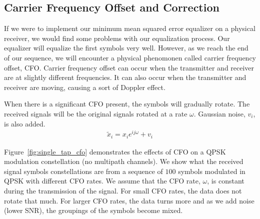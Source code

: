  
\subsection{Carrier Frequency Offset and Correction}

If we were to implement our minimum mean squared error equalizer on a physical receiver, we would find some problems with our equalization process.  
Our equalizer will equalize the first symbols very well.  However, as we reach the end of our sequence, we will encounter a physical phenomonen called carrier frequency offset, CFO.
Carrier frequency offset can occur when the transmitter and receiver are at slightly different frequencies.  It can also occur when the transmitter and receiver are moving, causing a sort of Doppler effect. 

When there is a significant CFO present, the symbols will gradually rotate. The received signals will be the original signals rotated at a rate $\omega$. Gaussian noise, $v_i$, is also added.
\begin{align}
\tilde{x}_i = x_i e^{ij\omega}+v_i
\end{align} 

Figure~\ref{fig:single_tap_cfo} demonstrates the effects of CFO on a QPSK modulation constellation (no multipath channels). 
We show what the received signal symbols constellations are from a sequence of $100$ symbols modulated in QPSK with different CFO rates.  We assume that the CFO rate, $\omega$, is constant during the transmission of the signal.
For small CFO rates, the data does not rotate that much.  For larger CFO rates, the data turns more and as we add noise (lower SNR), the groupings of the symbols become mixed.

